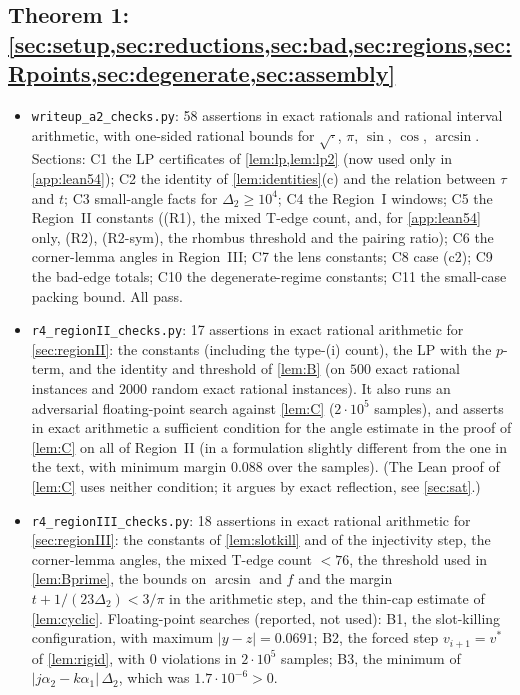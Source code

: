 \documentclass[11pt]{amsart}
\theoremstyle{definition}
\theoremstyle{remark}
\newcommand{\Dt}{\Delta_2}
\begin{document}
\subsection*{Theorem 1: \texorpdfstring{\cref{sec:setup,sec:reductions,sec:bad,sec:regions,sec:Rpoints,sec:degenerate,sec:assembly}}{Sections 2-8}}
\begin{itemize}[leftmargin=2em]
\item \texttt{writeup\_a2\_checks.py}: 58 assertions in exact rationals and rational interval arithmetic, with one-sided rational bounds for $\sqrt{\cdot}$, $\pi$, $\sin$, $\cos$, $\arcsin$. Sections: C1 the LP certificates of \cref{lem:lp,lem:lp2} (now used only in \cref{app:lean54}); C2 the identity of \cref{lem:identities}(c) and the relation between $\tau$ and $t$; C3 small-angle facts for $\Dt\ge10^4$; C4 the Region~I windows; C5 the Region~II constants ((R1), the mixed T-edge count, and, for \cref{app:lean54} only, (R2), (R2-sym), the rhombus threshold and the pairing ratio); C6 the corner-lemma angles in Region~III; C7 the lens constants; C8 case (c2); C9 the bad-edge totals; C10 the degenerate-regime constants; C11 the small-case packing bound. All pass.
\item \texttt{r4\_regionII\_checks.py}: 17 assertions in exact rational arithmetic for \cref{sec:regionII}: the constants (including the type-(i) count), the LP with the $p$-term, and the identity and threshold of \cref{lem:B} (on $500$ exact rational instances and $2000$ random exact rational instances). It also runs an adversarial floating-point search against \cref{lem:C} ($2\cdot10^5$ samples), and asserts in exact arithmetic a sufficient condition for the angle estimate in the proof of \cref{lem:C} on all of Region~II (in a formulation slightly different from the one in the text, with minimum margin $0.088$ over the samples). (The Lean proof of \cref{lem:C} uses neither condition; it argues by exact reflection, see \cref{sec:sat}.)
\item \texttt{r4\_regionIII\_checks.py}: 18 assertions in exact rational arithmetic for \cref{sec:regionIII}: the constants of \cref{lem:slotkill} and of the injectivity step, the corner-lemma angles, the mixed T-edge count $<76$, the threshold used in \cref{lem:Bprime}, the bounds on $\arcsin$ and $f$ and the margin $t+1/(23\Dt)<3/\pi$ in the arithmetic step, and the thin-cap estimate of \cref{lem:cyclic}. Floating-point searches (reported, not used): B1, the slot-killing configuration, with maximum $|y-z|=0.0691$; B2, the forced step $v_{i+1}=v^*$ of \cref{lem:rigid}, with $0$ violations in $2\cdot10^5$ samples; B3, the minimum of $|j\alpha_2-k\alpha_1|\,\Dt$, which was $1.7\cdot10^{-6}>0$.

\end{itemize}
\end{document}
